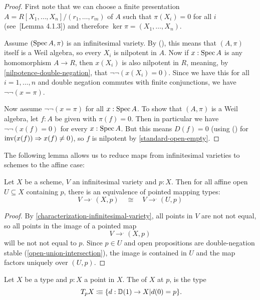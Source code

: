 \begin{proof}
  First note that we can choose a finite presentation
  $A = R[X_1, \dots, X_n]/(r_1, \dots, r_m)$
  of $A$
  such that $\pi(X_i) = 0$ for all $i$
  (see~\cite{david-orbifolds}[Lemma 4.1.3])
  and therefore $\ker \pi = (X_1, \dots, X_n)$.

  Assume $(\operatorname{Spec} A, \pi)$ is an infinitesimal variety.
  By (), this means that $(A, \pi)$ itself is a Weil algebra,
  so every $X_i$ is nilpotent in $A$.
  Now if $x : \operatorname{Spec} A$ is any homomorphism $A \to R$,
  then $x(X_i)$ is also nilpotent in $R$,
  meaning, by \cref{nilpotence-double-negation}, that $\lnot \lnot (x(X_i) = 0)$.
  Since we have this for all $i = 1, \dots, n$
  and double negation commutes with finite conjunctions,
  we have $\lnot \lnot (x = \pi)$.

  Now assume $\lnot \lnot (x = \pi)$ for all $x : \operatorname{Spec} A$.
  To show that $(A, \pi)$ is a Weil algebra,
  let $f : A$ be given with $\pi(f) = 0$.
  Then in particular we have $\lnot \lnot (x(f) = 0)$
  for every $x : \operatorname{Spec} A$.
  But this means $D(f) = 0$
  (using () for $\mathrm{inv}(x(f)) \Rightarrow x(f) \neq 0$),
  so $f$ is nilpotent by \cref{standard-open-empty}.
\end{proof}

The following lemma allows us to reduce
maps from infinitesimal varieties to schemes
to the affine case:

\begin{lemma}%
  \label{affine-opens-infinitesimal-closed}
  Let $X$ be a scheme, $V$ an infinitesimal variety and $p:X$.
  Then for all affine open $U\subseteq X$
  containing $p$, there is an equivalence
  of pointed mapping types:
  \[ V\to^. (X, p) \quad\cong\quad V\to^. (U, p) \]
\end{lemma}

\begin{proof}
  By \cref{characterization-infinitesimal-variety},
  all points in $V$ are not not equal,
  so all points in the image of a pointed map
  \[ V \to^. (X, p) \]
  will be not not equal to $p$.
  Since $p \in U$ and open propositions are double-negation stable
  (\cref{open-union-intersection}),
  the image is contained in $U$
  and the map factors uniquely over $(U, p)$.
\end{proof}

\begin{definition}
  Let $X$ be a type and $p:X$ a point in $X$.
  The  of $X$ at $p$, is the type
  \[ T_pX\colonequiv \{d:\D(1)\to X\vert d(0)=p \}\rlap{.}\]
\end{definition}

